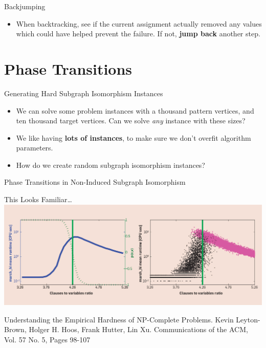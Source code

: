 \documentclass{beamer}
\begin{document}
\begin{frame}{Backjumping}

    \begin{itemize}
        \item When backtracking, see if the current assignment actually removed any values which
            could have helped prevent the failure. If not, \textbf{jump back} another step.
    \end{itemize}

\end{frame}

\section{Phase Transitions}

\begin{frame}{Generating Hard Subgraph Isomorphism Instances}

    \begin{itemize}
        \item We can solve some problem instances with a thousand pattern vertices, and ten thousand
            target vertices. Can we solve \emph{any} instance with these sizes?

        \item We like having \textbf{lots of instances}, to make sure we don't overfit algorithm
            parameters.

        \item How do we create random subgraph isomorphism instances?
    \end{itemize}

\end{frame}

\begin{frame}{Phase Transitions in Non-Induced Subgraph Isomorphism}

    

\end{frame}

\begin{frame}{This Looks Familiar\ldots}
    \centering
    \includegraphics*[keepaspectratio=true,scale=0.25]{sat.jpg}

    \par\flushleft
    Understanding the Empirical Hardness of NP-Complete Problems. Kevin Leyton-Brown, Holger H.
    Hoos, Frank Hutter, Lin Xu.  Communications of the ACM, Vol. 57 No. 5, Pages 98-107
\end{frame}
\end{document}
